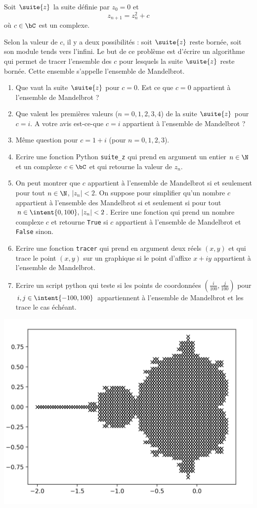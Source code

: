 \begin{exercice}
Soit $\suite{z}$ la suite définie par $z_0=0$ et 
$$z_{n+1} =z_n^2 +c$$
où $c\in \bC$ est un complexe. 

Selon la valeur de $c$, il y a deux possibilités : soit $\suite{z}$ reste bornée, soit son module tends vers l'infini. Le but de ce problème est d'écrire un algorithme qui permet de tracer l'ensemble des $c$ pour lesquels la suite $\suite{z}$ reste bornée. Cette ensemble s'appelle l'ensemble de Mandelbrot. 
\begin{enumerate}
\item Que vaut la suite $\suite{z}$ pour $c=0$. Est ce que $c=0$ appartient à l'ensemble de Mandelbrot ?

\item Que valent les premières valeurs ($n=0,1,2,3,4$) de la suite $\suite{z}$ pour $c=i$.  A votre avis est-ce-que $c=i$ appartient à l'ensemble de Mandelbrot ? 
\item Même question pour $c=1+i$ (pour $n=0,1,2,3$).
\item Ecrire une fonction Python \texttt{suite\_z} qui prend en argument un entier $n\in \N$ et un complexe $c\in \bC$ et qui retourne la valeur de $z_n$.
\item On peut montrer que $c$ appartient à l'ensemble de Mandelbrot si et seulement pour tout $n\in \N$,  $|z_n|<2$.
On suppose pour simplifier qu'un nombre $c$ appartient à l'ensemble des Mandelbrot si et seulement si  pour tout $n\in \intent{0,100},   \, |z_n|<2$.
Ecrire une fonction  qui prend un nombre complexe $c$ et retourne \texttt{True} si $c$ appartient à l'ensemble de Mandelbrot et \texttt{False} sinon. 
\item Ecrire une fonction \texttt{tracer} qui prend en argument deux réels $(x,y)$ et qui trace le point $(x,y)$ sur un graphique si le point d'affixe $x+iy$ appartient à l'ensemble de Mandelbrot. 
\item Ecrire un script python qui teste  si les points de coordonnées $\left( \frac{i}{100}, \frac{j}{100}\right)$ pour $i, j\in \intent{-100,100}$ appartiennent à l'ensemble de Mandelbrot et les trace le cas échéant. 
\end{enumerate}
\begin{center}
\includegraphics[scale=0.4]{assets/mandelbrot.png}

\end{center}
\end{exercice}
